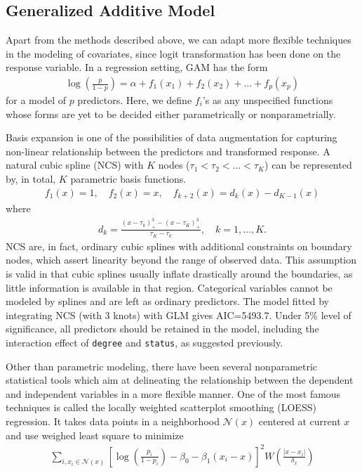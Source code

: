 \subsection{Generalized Additive Model}
Apart from the methods described above, we can adapt more flexible techniques in the modeling of covariates, since logit transformation has been done on the response variable. In a regression setting, GAM has the form
\begin{align}
\log\left(\frac{p}{1-p}\right)=\alpha+f_1(x_1)+f_2(x_2)+\dots+f_p(x_p)
\end{align}
for a model of $p$ predictors. Here, we define $f_i$'s as any unspecified functions whose forms are yet to be decided either parametrically or nonparametrially. 
\par Basis expansion is one of the possibilities of data augmentation for capturing non-linear relationship between the predictors and transformed response. A natural cubic spline (NCS) with $K$ nodes ($\tau_1<\tau_2<\dots<\tau_K$) can be represented by, in total, $K$ parametric basis functions.
\begin{align}
f_1(x)=1,\quad f_2(x)=x, \quad f_{k+2}(x)=d_k(x)-d_{K-1}(x)
\end{align}
where
\begin{align}
d_{k}=\frac{(x-\tau_k)^3_+-(x-\tau_K)^3_+}{\tau_K-\tau_k},\quad k=1,\dots,K.
\end{align}
NCS are, in fact, ordinary cubic splines with additional constraints on boundary nodes, which assert linearity beyond the range of observed data. This assumption is valid in that cubic splines usually inflate drastically around the boundaries, as little information is available in that region. Categorical variables cannot be modeled by splines and are left as ordinary predictors. The model fitted by integrating NCS (with 3 knots) with GLM gives AIC=5493.7. Under 5\% level of significance, all predictors should be retained in the model, including the interaction effect of \texttt{degree} and \texttt{status}, as suggested previously.
\par Other than parametric modeling, there have been several nonparametric statistical tools which aim at delineating the relationship between the dependent and independent variables in a more flexible manner. One of the most famous techniques is called the locally weighted scatterplot smoothing (LOESS) regression. It takes data points in a neighborhood $\mathcal{N}(x)$ centered at current $x$ and use weighed least square to minimize
\begin{align}
\sum_{i, x_i\in \mathcal{N}(x)}\left[\log\left(\frac{p_i}{1-p_i}\right)-\beta_0-\beta_1(x_i-x)\right]^2W\left(\frac{|x-x_i|}{\delta_x}\right)
\end{align}
